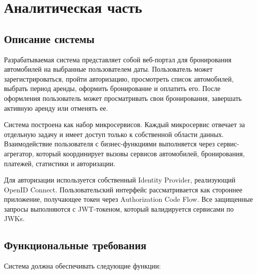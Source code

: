 \chapter{Аналитическая часть}

\section{Описание системы}

Разрабатываемая система представляет собой веб-портал для бронирования автомобилей на выбранные пользователем даты. Пользователь может зарегистрироваться, пройти авторизацию, просмотреть список автомобилей, выбрать период аренды, оформить бронирование и оплатить его. После оформления пользователь может просматривать свои бронирования, завершать активную аренду или отменять ее.

Система построена как набор микросервисов. Каждый микросервис отвечает за отдельную задачу и имеет доступ только к собственной области данных. Взаимодействие пользователя с бизнес-функциями выполняется через сервис-агрегатор, который координирует вызовы сервисов автомобилей, бронирования, платежей, статистики и авторизации.

Для авторизации используется собственный Identity Provider, реализующий OpenID Connect. Пользовательский интерфейс рассматривается как стороннее приложение, получающее токен через Authorization Code Flow. Все защищенные запросы выполняются с JWT-токеном, который валидируется сервисами по JWKs.

\section{Функциональные требования}

Система должна обеспечивать следующие функции:

